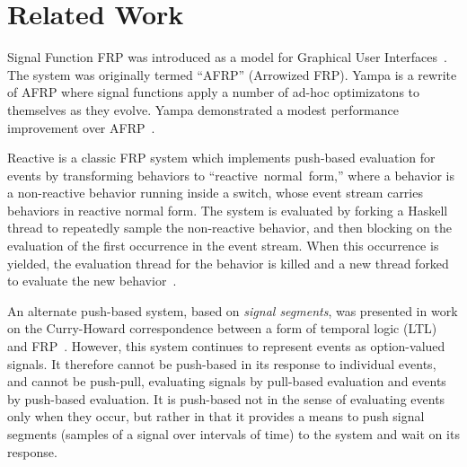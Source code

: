 \section{Related Work}
\label{section:Related_Work}

Signal Function FRP was introduced as a model for Graphical User Interfaces~\cite{Courtney2001-1}.
The system was originally termed ``AFRP'' (Arrowized FRP). Yampa is a rewrite of
AFRP where signal functions apply a number of ad-hoc optimizatons to themselves
as they evolve. Yampa demonstrated a modest performance improvement
over AFRP~\cite{Nilsson2005}.

Reactive is a classic FRP system which implements push-based evaluation for events
by transforming behaviors to ``reactive~normal~form,'' where a behavior
is a non-reactive behavior running inside a switch, whose event stream carries
behaviors in reactive normal form. The system is evaluated by forking a Haskell
thread to repeatedly sample the non-reactive behavior, and then blocking on the
evaluation of the first occurrence in the event stream. When this occurrence
is yielded, the evaluation thread for the behavior is killed and a new
thread forked to evaluate the new behavior~\cite{Elliott2009}.

An alternate push-based system, based on {\em signal segments}, was presented in
work on the Curry-Howard correspondence between a form of temporal logic (LTL)
and FRP~\cite{Jeffrey2012}. However, this system continues to represent events
as option-valued signals. It therefore cannot be push-based in its response to
individual events, and cannot be push-pull, evaluating signals by pull-based
evaluation and events by push-based evaluation. It is push-based not in the
sense of evaluating events only when they occur, but rather in that it provides
a means to push signal segments (samples of a signal over intervals of time) to
the system and wait on its response.


